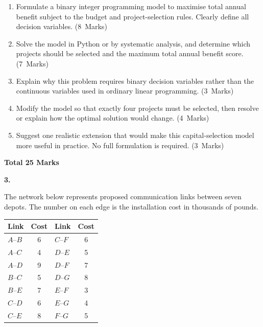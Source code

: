 \documentclass[11pt,a4paper]{article}
\newcommand{\markalloc}[1]{\nobreak\hfill\mbox{(#1 Marks)}}
\newcommand{\questiontotal}[1]{\begin{flushright}\textbf{Total #1 Marks}\end{flushright}}
\begin{document}
\begin{enumerate}
\item Formulate a binary integer programming model to maximise total annual benefit subject to the budget and project-selection rules. Clearly define all decision variables. \markalloc{8}

\item Solve the model in Python or by systematic analysis, and determine which projects should be selected and the maximum total annual benefit score. \markalloc{7}

\item Explain why this problem requires binary decision variables rather than the continuous variables used in ordinary linear programming. \markalloc{3}

\item Modify the model so that exactly four projects must be selected, then resolve or explain how the optimal solution would change. \markalloc{4}

\item Suggest one realistic extension that would make this capital-selection model more useful in practice. No full formulation is required. \markalloc{3}
\end{enumerate}

\questiontotal{25}

\newpage

\textbf{3.}

The network below represents proposed communication links between seven depots.
The number on each edge is the installation cost in thousands of pounds.

\begin{center}
\begin{tabular}{lclc}
\toprule
Link & Cost & Link & Cost \\
\midrule
$A$--$B$ & 6 & $C$--$F$ & 6 \\
$A$--$C$ & 4 & $D$--$E$ & 5 \\
$A$--$D$ & 9 & $D$--$F$ & 7 \\
$B$--$C$ & 5 & $D$--$G$ & 8 \\
$B$--$E$ & 7 & $E$--$F$ & 3 \\
$C$--$D$ & 6 & $E$--$G$ & 4 \\
$C$--$E$ & 8 & $F$--$G$ & 5 \\
\bottomrule
\end{tabular}
\end{center}
\end{document}
